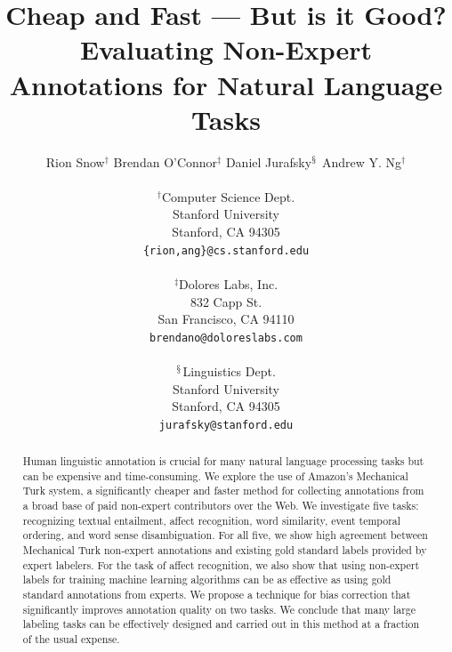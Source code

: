\documentclass[11pt]{article}
\title{Cheap and Fast  ---  But is it Good?\\Evaluating Non-Expert Annotations for Natural Language Tasks }
\author{Rion Snow$^\dagger$ \hspace{.3cm} Brendan O'Connor$^\ddagger$ \hspace{.3cm} Daniel Jurafsky$^\mathchar "278$ \hspace{.3cm} Andrew Y. Ng$^\dagger$ \\
\AND  \vspace{-0.35in} \\ $^\dagger$Computer Science Dept.\\
Stanford University \\
Stanford, CA 94305 \\
\footnotesize{\tt \{rion,ang\}@cs.stanford.edu}\\
\And   \vspace{-0.35in}\\
$^\ddagger$Dolores Labs, Inc.\\
832 Capp St. \\
San Francisco, CA 94110 \\
\footnotesize{\tt brendano@doloreslabs.com} \\
\And   \vspace{-0.35in} \\
$^\mathchar "278$Linguistics Dept. \\
Stanford University\\
Stanford, CA 94305 \\
\footnotesize{\tt jurafsky@stanford.edu} }
\newlength{\abstractReduceTop}
\begin{document}
\maketitle

\vspace*{\abstractReduceTop}
\begin{abstract}
\small{Human linguistic annotation is crucial for many natural
language processing tasks but can be expensive and time-consuming.
We explore the use of Amazon's Mechanical Turk system, a significantly cheaper and faster method for collecting annotations from a broad base of paid non-expert contributors over the Web.  We investigate five tasks:  recognizing textual entailment, affect recognition, word similarity,
event temporal ordering, and word sense disambiguation.
For all five, we show high agreement between Mechanical Turk non-expert annotations
and existing gold standard labels provided by expert labelers.  
For the task of affect recognition, we also show that using non-expert
labels for training machine learning algorithms can be as effective
as using gold standard annotations from experts.  We propose a technique for bias correction that significantly improves annotation quality on two tasks.  We conclude that 
many large labeling tasks can be effectively designed and carried
out in this method at a fraction of the usual expense.}



\end{abstract}
\end{document}

